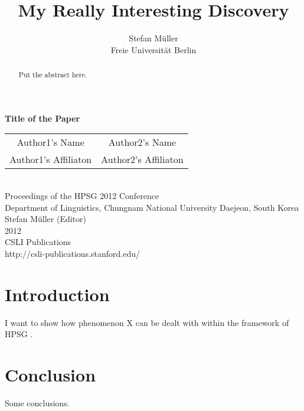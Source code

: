 \documentclass[11pt,a4paper,fleqn,draft]{article}
\title{My Really Interesting Discovery}
\author{Stefan M{\"u}ller\\
Freie Universit{\"a}t Berlin}
\begin{document}

\begin{center}
{\LARGE\bf Title of the Paper}\\[\baselineskip]

\begin{tabular}{cc}
{\large Author1's Name} & {\large Author2's Name}\\
Author1's Affiliaton    & Author2's Affiliaton\\
\end{tabular}
\\[3\baselineskip]

                Proceedings of the HPSG 2012 Conference\\[\baselineskip]

Department of Linguistics, Chungnam National University Daejeon, South Korea\\[\baselineskip]

                        Stefan M{\"u}ller (Editor)\\[\baselineskip]

                                2012\\[\baselineskip]

                          CSLI Publications\\[\baselineskip]

              http://csli-publications.stanford.edu/

\end{center}

\newpage

\begin{abstract}
Put the abstract here.
\end{abstract}

\setcounter{footnote}{2}
\renewcommand{\thefootnote}{\fnsymbol{footnote}}
\renewcommand{\thefootnote}{\arabic{footnote}}
\setcounter{footnote}{0}


\section{Introduction}

I want to show how phenomenon X can be dealt with within the framework of HPSG
\citep{PS87a,PS94a}.

\section{Conclusion}

Some conclusions.



 

\end{document}
